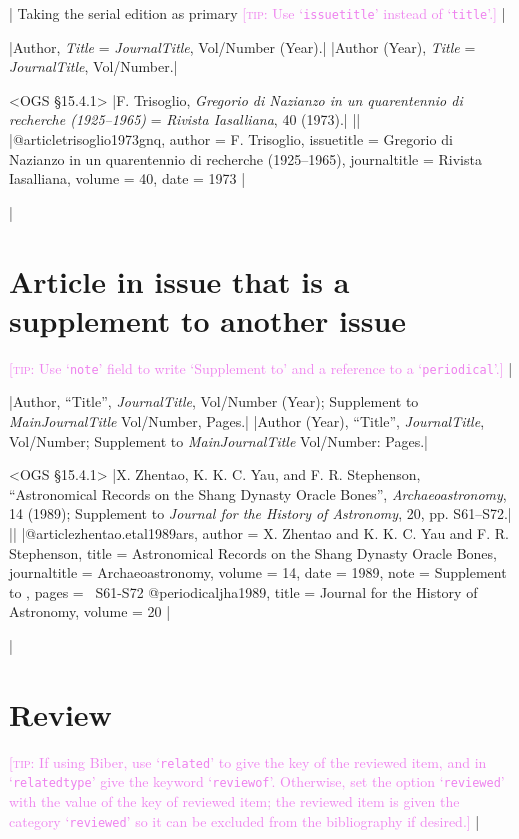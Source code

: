 \documentclass[extrafontsizes,11pt,a4paper,oneside]{memoir}
\newcommand*{\lit}[1]{\textsf{#1}}
\newcommand*{\code}[1]{`\texttt{#1}'}
\newcommand*{\aside}[1]{\textcolor{violet}{[\textsc{tip:} #1]}}
\begin{document}
\todoc|
Taking the serial edition as primary \aside{Use \code{issuetitle} instead of \code{title}.}
|

\specs
|Author, \emph{Title} = \emph{JournalTitle}, Vol/Number (Year).|%
|Author (Year), \emph{Title} = \emph{JournalTitle}, Vol/Number.|

\bibexample<OGS \S15.4.1>
|F. Trisoglio, \emph{Gregorio di Nazianzo in un quarentennio di recherche (1925--1965)} = \emph{Rivista Iasalliana}, 40 (1973).|%
||%
|@article{trisoglio1973gnq,
  author = {F. Trisoglio},
  issuetitle = {Gregorio di Nazianzo in un quarentennio di recherche (1925--1965)},
  journaltitle = {Rivista Iasalliana},
  volume = {40},
  date = {1973}
}|
  
\todoc|
\section{Article in issue that is a supplement to another issue}

\aside{Use \code{note} field to write ‘Supplement to’ and a reference to a \code{periodical}.}
|

\specs
|Author, \enquote{Title}, \emph{JournalTitle}, Vol/Number (Year); \lit{Supplement to} \emph{MainJournalTitle} Vol/Number, Pages.|%
|Author (Year), \enquote{Title}, \emph{JournalTitle}, Vol/Number; \lit{Supplement to} \emph{MainJournalTitle} Vol/Number: Pages.|

\bibexample<OGS \S15.4.1>
|X. Zhentao, K. K. C. Yau, and F. R. Stephenson, \enquote{Astronomical Records on the Shang Dynasty Oracle Bones}, \emph{Archaeoastronomy}, 14 (1989); Supplement to \emph{Journal for the History of Astronomy}, 20, pp. S61--S72.|%
||%
|@article{zhentao.etal1989ars,
  author = {X. Zhentao and K. K. C. Yau and F. R. Stephenson},
  title = {Astronomical Records on the Shang Dynasty Oracle Bones},
  journaltitle = {Archaeoastronomy},
  volume = {14},
  date = {1989},
  note = {Supplement to },
  pages = {\ppno~S61-S72}
}
@periodical{jha1989,
  title = {Journal for the History of Astronomy},
  volume = {20}
}|
  
\todoc|
\section{Review}

\aside{If using Biber, use \code{related} to give the key of the reviewed item, and in \code{relatedtype} give the keyword \code{reviewof}. Otherwise, set the option \code{reviewed} with the value of the key of reviewed item; the reviewed item is given the category \code{reviewed} so it can be excluded from the bibliography if desired.}
|
\end{document}
